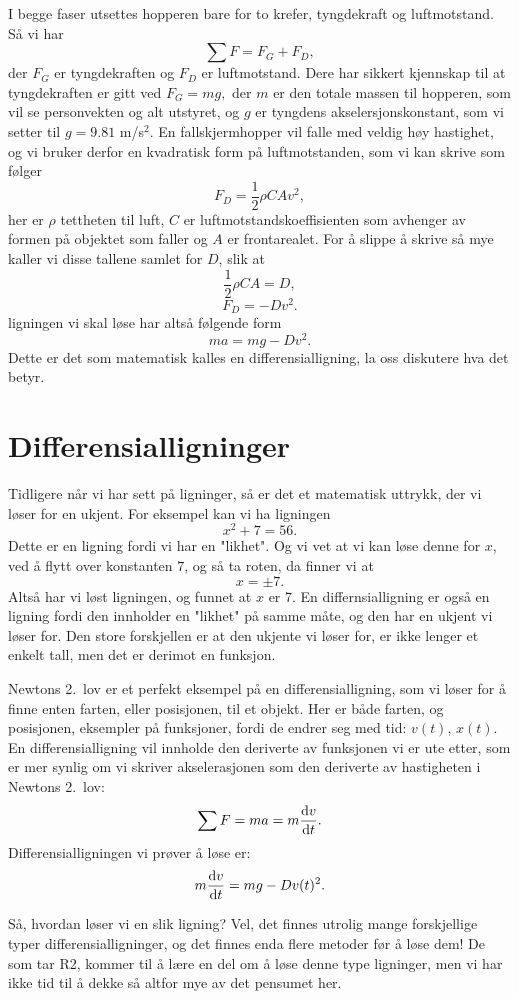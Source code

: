 \documentclass[a4paper, 11pt, notitlepage]{article}
\renewcommand{\d}{{\rm d}}
\begin{document}
I begge faser utsettes hopperen bare for to krefer, tyngdekraft og luftmotstand. Så vi har
$$\sum F = F_G + F_D,$$
der $F_G$ er tyngdekraften og $F_D$ er luftmotstand. Dere har sikkert kjennskap til at tyngdekraften er gitt ved
$F_G = mg,$
der $m$ er den totale massen til hopperen, som vil se personvekten og alt utstyret, og $g$ er tyngdens akselersjonskonstant, som vi setter til $g=9.81$ m/s$^2$. En fallskjermhopper vil falle med veldig høy hastighet, og vi bruker derfor en kvadratisk form på luftmotstanden, som vi kan skrive som følger
$$F_D = \frac{1}{2}\rho C A v^2,$$
her er $\rho$ tettheten til luft, $C$ er luftmotstandskoeffisienten som avhenger av formen på objektet som faller og $A$ er frontarealet.
For å slippe å skrive så mye kaller vi disse tallene samlet for $D$, slik at
$$\frac{1}{2}\rho C A = D,$$
$$F_D = -Dv^2.$$
ligningen vi skal løse har altså følgende form
$$ma = mg - D v^2.$$
Dette er det som matematisk kalles en differensialligning, la oss diskutere hva det betyr.

\section*{Differensialligninger}
Tidligere når vi har sett på ligninger, så er det et matematisk uttrykk, der vi løser for en ukjent. For eksempel kan vi ha ligningen
$$x^2 + 7 = 56.$$
Dette er en ligning fordi vi har en "likhet". Og vi vet at vi kan løse denne for $x$, ved å flytt over konstanten $7$, og så ta roten, da finner vi at 
$$x = \pm 7.$$
Altså har vi løst ligningen, og funnet at $x$ er 7. En differnsialligning er også en ligning fordi den innholder en "likhet" på samme måte, og den har en ukjent vi løser for. Den store forskjellen er at den ukjente vi løser for, er ikke lenger et enkelt tall, men det er derimot en funksjon.

Newtons 2.\ lov er et perfekt eksempel på en differensialligning, som vi løser for å finne enten farten, eller posisjonen, til et objekt. Her er både farten, og posisjonen, eksempler på funksjoner, fordi de endrer seg med tid: $v(t)$, $x(t)$. En differensialligning vil innholde den deriverte av funksjonen vi er ute etter, som er mer synlig om vi skriver akselerasjonen som den deriverte av hastigheten i Newtons 2.\ lov:
$$\sum F = ma = m\frac{\d v}{\d t}.$$
Differensialligningen vi prøver å løse er:
$$m\frac{\d v}{\d t} = mg - D v(t)^2.$$

Så, hvordan løser vi en slik ligning? Vel, det finnes utrolig mange forskjellige typer differensialligninger, og det finnes enda flere metoder før å løse dem! De som tar R2, kommer til å lære en del om å løse denne type ligninger, men vi har ikke tid til å dekke så altfor mye av det pensumet her.
\end{document}
